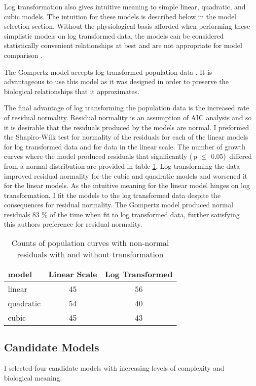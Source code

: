 \documentclass[11pt]{article}
\begin{document}
  Log transformation also gives intuitive meaning to simple linear, quadratic, and cubic models. The intuition for these models is described below in the model selection section. Without the physiological basis afforded when performing these simplistic models on log transformed data, the models can be considered statistically convenient relationships at best and are not appropriate for model comparison \citep{Baranyi1995}. 

  The Gompertz model accepts log transformed population data \citep{Peleg2011}. It is advantageous to use this model as it was designed in order to preserve the biological relationships that it approximates. 

  The final advantage of log transforming the population data is the increased rate of residual normality. Residual normality is an assumption of AIC analysis \citep{Johnson2004} and so it is desirable that the residuals produced by the models are normal. I preformed the Shapiro-Wilk test for normality of the residuals for each of the linear models for log transformed data and for data in the linear scale. The number of growth curves where the model produced residuals that significantly (\,p $\le$ 0.05)\, differed from a normal distribution are provided in table \ref{tbl1}. Log transforming the data improved residual normality for the cubic and quadratic models and worsened it for the linear models.  As the intuitive meaning for the linear model hinges on log transformation, I fit the models to the log transformed data despite the consequences for residual normality. The Gompertz model produced normal residuals 83 \% of the time when fit to log transformed data, further satisfying this authors preference for residual normality. 

   \begin{table}[!ht]
    \centering
    \begin{tabular}{lcc}
    \hline
        \textbf{model} & \textbf{Linear Scale} & \textbf{Log Transformed} \\ \hline
        linear & 45 & 56 \\ 
        quadratic & 54 & 40 \\ 
        cubic & 45 & 43 \\ \hline
    \end{tabular}
    \caption{Counts of population curves with non-normal residuals with and without transformation}
    \label{tbl1}
    \end{table}

  \subsection{Candidate Models}
  I selected four candidate models with increasing levels of complexity and biological meaning.
\end{document}
